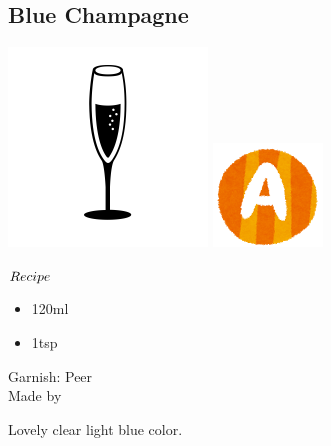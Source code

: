 \subsection{Blue Champagne}
\vspace{-7.6mm}
\hspace{48mm}
\includegraphics[scale=.08]{cocktail_glass_flute.png}
\includegraphics[scale=.12]{capital_a.png}
\vspace{2.5mm}
\begin{itembox}[l]{\boldmath $Recipe$}
\begin{itemize}
\setlength{\parskip}{0cm}
\setlength{\itemsep}{0cm}
\item \champagne 120ml
\item \bc 1tsp
\end{itemize}
\vspace{-4mm}
Garnish: \orange Peer\\
Made by \build
\end{itembox}
Lovely clear light blue color.
